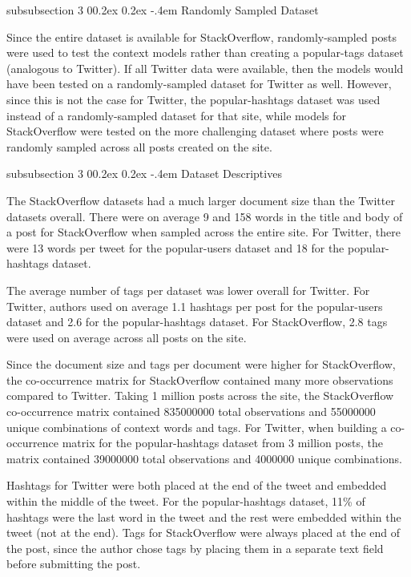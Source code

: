 \documentclass[man,floatsintext,donotrepeattitle]{apa6}
\makeatletter
\renewcommand{\subsubsection}{%
  \@startsection
  {subsubsection}%
  {3}%
  {\parindent}%
  {0\baselineskip \@plus 0.2ex \@minus 0.2ex}%
  {-.4em}%
  {\normalfont\normalsize\bfseries\addperi}}
\makeatother
\begin{document}
\subsubsection{Randomly Sampled Dataset}

Since the entire dataset is available for StackOverflow, randomly-sampled posts were used to test the context models rather than creating a popular-tags dataset (analogous to Twitter).
If all Twitter data were available, then the models would have been tested on a randomly-sampled dataset for Twitter as well.
However, since this is not the case for Twitter, the popular-hashtags dataset was used instead of a randomly-sampled dataset for that site,
while models for StackOverflow were tested on the more challenging dataset where posts were randomly sampled across all posts created on the site.

\subsubsection{Dataset Descriptives}

The StackOverflow datasets had a much larger document size than the Twitter datasets overall.
There were on average 9 and 158 words in the title and body of a post for StackOverflow when sampled across the entire site. 
For Twitter, there were 13 words per tweet for the popular-users dataset and 18 for the popular-hashtags dataset.

The average number of tags per dataset was lower overall for Twitter.
For Twitter, authors used on average 1.1 hashtags per post for the popular-users dataset and 2.6 for the popular-hashtags dataset.
For StackOverflow, 2.8 tags were used on average across all posts on the site.

Since the document size and tags per document were higher for StackOverflow, the co-occurrence matrix for StackOverflow contained many more observations compared to Twitter.
Taking 1 million posts across the site, the StackOverflow co-occurrence matrix contained \num{835000000} total observations and \num{55000000} unique combinations of context words and tags.
For Twitter, when building a co-occurrence matrix for the popular-hashtags dataset from 3 million posts, the matrix contained \num{39000000} total observations and \num{4000000} unique combinations.

Hashtags for Twitter were both placed at the end of the tweet and embedded within the middle of the tweet.
For the popular-hashtags dataset, 11\% of hashtags were the last word in the tweet and the rest were embedded within the tweet (not at the end).
Tags for StackOverflow were always placed at the end of the post, since the author chose tags by placing them in a separate text field before submitting the post.
\end{document}

